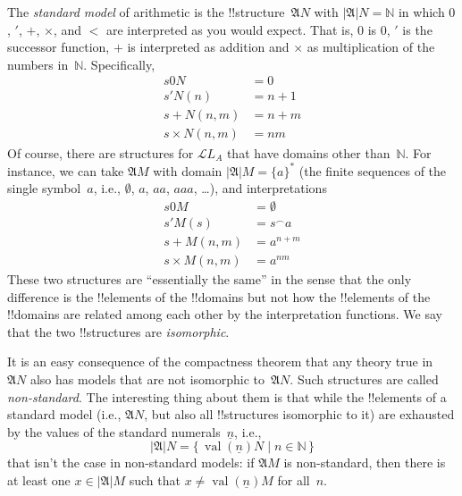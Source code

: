 \documentclass[10pt,a4paper]{article}
\theoremstyle{plain}
\theoremstyle{definition}
\theoremstyle{remark}
\providecommand{\Obj}{}
\providecommand{\Struct}{\ensuremath{\mathfrak{A}}}
\providecommand{\Domain}{\ensuremath{|\mathfrak{A}|}}
\providecommand{\Assign}{\ensuremath{s}}
\providecommand{\Lang}{\ensuremath{\mathcal{L}}}
\providecommand{\num}[1]{\underline{#1}}
\providecommand{\Nat}{\ensuremath{\mathbb{N}}}
\providecommand{\concat}{\mathbin{{}^\frown}}
\providecommand{\Setabs}[2]{\{\, #1 \mid #2 \,\}}
\providecommand{\Value}[1]{\operatorname{val}(#1)}
\begin{document}
The \emph{standard model} of arithmetic is the
!!{structure}~$\Struct{N}$ with $\Domain{N} = \Nat$ in which
$\Obj{0}$, $\prime$, $+$, $\times$, and $<$ are interpreted as you
would expect. That is, $\Obj{0}$ is $0$, $\prime$ is the successor
function, $+$ is interpreted as addition and $\times$ as multiplication
of the numbers in~$\Nat$. Specifically,
\begin{align*}
  \Assign{\Obj{0}}{N} & = 0\\
  \Assign{\prime}{N}(n) & = n + 1\\
  \Assign{+}{N}(n, m) & = n + m\\
  \Assign{\times}{N}(n, m) & = nm
\end{align*}
Of course, there are structures for $\Lang{L_A}$ that have domains
other than~$\Nat$. For instance, we can take $\Struct{M}$ with domain
$\Domain{M} = \{a\}^*$ (the finite sequences of the single
symbol~$a$, i.e., $\emptyset$, $a$, $aa$, $aaa$, \dots), and
interpretations
\begin{align*}
  \Assign{\Obj{0}}{M} & = \emptyset\\
  \Assign{\prime}{M}(s) & = s \concat a\\
  \Assign{+}{M}(n, m) & = a^{n + m}\\
  \Assign{\times}{M}(n, m) & = a^{nm}
\end{align*}
These two structures are ``essentially the same'' in the sense that
the only difference is the !!{element}s of the !!{domain}s but not how
the !!{element}s of the !!{domain}s are related among each other by
the interpretation functions. We say that the two !!{structure}s are
\emph{isomorphic}.

It is an easy consequence of the compactness theorem that any theory
true in~$\Struct{N}$ also has models that are not isomorphic
to~$\Struct{N}$.  Such structures are called \emph{non-standard}.  The
interesting thing about them is that while the !!{element}s of a
standard model (i.e., $\Struct{N}$, but also all !!{structure}s
isomorphic to it) are exhausted by the values of the standard
numerals~$\num{n}$, i.e.,
\[
\Domain{N} = \Setabs{\Value{\num{n}}{N}}{n \in \Nat}
\]
that isn't the case in non-standard models: if $\Struct{M}$ is
non-standard, then there is at least one $x \in \Domain{M}$ such that
$x \neq \Value{\num{n}}{M}$ for all~$n$.
\end{document}
